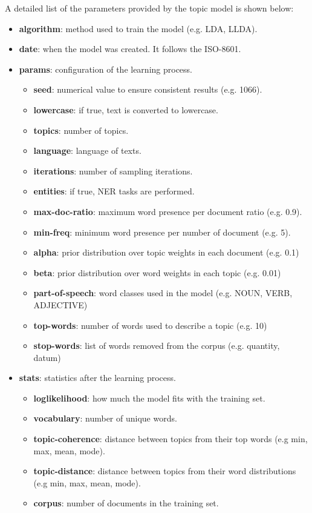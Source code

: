 A detailed list of the parameters provided by the topic model is shown below:
\begin{itemize}
\item \textbf{algorithm}: method used to train the model (e.g. LDA, LLDA).
\item \textbf{date}: when the model was created. It follows the ISO-8601.
\item \textbf{params}: configuration of the learning process.
	\begin{itemize}
	\item \textbf{seed}: numerical value to ensure consistent results (e.g. 1066).
	\item \textbf{lowercase}: if true, text is converted to lowercase.
	\item \textbf{topics}: number of topics.
	\item \textbf{language}: language of texts.
	\item \textbf{iterations}: number of sampling iterations.
	\item \textbf{entities}: if true, NER tasks are performed.
	\item \textbf{max-doc-ratio}: maximum word presence per document ratio (e.g. 0.9).
	\item \textbf{min-freq}: minimum word presence per number of document (e.g. 5). 
	\item \textbf{alpha}: prior distribution over topic weights in each document (e.g. 0.1)
	\item \textbf{beta}: prior distribution over word weights in each topic (e.g. 0.01)
	\item \textbf{part-of-speech}: word classes used in the model (e.g. NOUN, VERB, ADJECTIVE)
	\item \textbf{top-words}: number of words used to describe a topic (e.g. 10)
	\item \textbf{stop-words}: list of words removed from the corpus (e.g. quantity, datum) 
	\end{itemize}
\item \textbf{stats}: statistics after the learning process.
	\begin{itemize}
	\item \textbf{loglikelihood}: how much the model fits with the training set.
	\item \textbf{vocabulary}: number of unique words.
	\item \textbf{topic-coherence}: distance between topics from their top words (e.g min, max, mean, mode).
	\item \textbf{topic-distance}: distance between topics from their word distributions (e.g min, max, mean, mode).
	\item \textbf{corpus}: number of documents in the training set. 
	\end{itemize}
\end{itemize}


